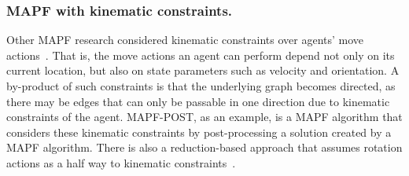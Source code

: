 \documentclass[letterpaper]{article} %
\newcommand{\mapf}{\ac{MAPF}\xspace}
\newcommand{\comment}[1]{{\nb{\textbf{Comment:}}{orange}{#1}}}
\begin{document}
\subsubsection{\mapf with kinematic constraints.}
Other \mapf research considered kinematic constraints over agents' move actions~\cite{honig2017summary,walker17hierarchical}. That is, the move actions an agent can perform depend not only on its current location, but also on state parameters such as velocity and orientation. A by-product of such constraints is that the underlying graph becomes directed, as there may be edges that can only be passable in one direction due to kinematic constraints of the agent.  MAPF-POST, as an example, is a \mapf algorithm that considers these kinematic constraints by post-processing a solution created by a \mapf algorithm. There is also a reduction-based approach that assumes rotation actions as a half way to kinematic constraints~\cite{BartakIBERAMIA18}.





\end{document}
